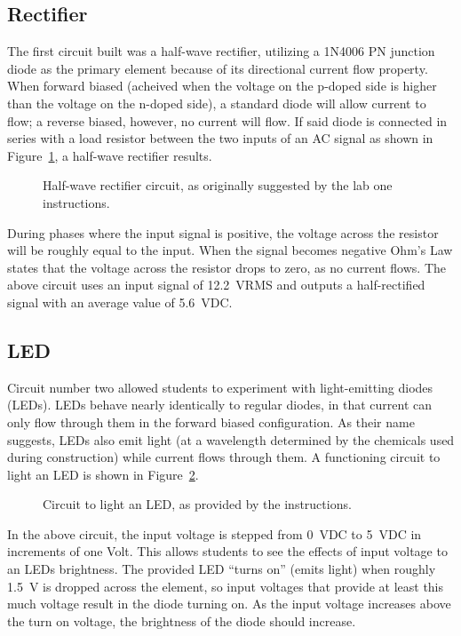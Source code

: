 \subsection{Rectifier}
The first circuit built was a half-wave rectifier, utilizing a 1N4006 PN
junction diode as the primary element because of its directional current flow
property.  When forward biased (acheived when the voltage on the p-doped side
is higher than the voltage on the n-doped side), a standard diode will allow
current to flow; a reverse biased, however, no current will flow.  If said
diode is connected in series with a load resistor between the two inputs of an
AC signal as shown in Figure~\ref{fig:schem1}, a half-wave rectifier results.
%
\begin{figure}[H]
	\centering
	
	\caption{Half-wave rectifier circuit, as originally suggested by the lab one instructions.}
	\label{fig:schem1}
\end{figure}
%
During phases where the input signal is positive, the voltage across the
resistor will be roughly equal to the input.  When the signal becomes negative
Ohm's Law states that the voltage across the resistor drops to zero, as no
current flows.  The above circuit uses an input signal of \SI{12.2}{\volt}RMS
and outputs a half-rectified signal with an average value of \SI{5.6}{\volt}DC.

\subsection{LED}
Circuit number two allowed students to experiment with light-emitting diodes
(LEDs).  LEDs behave nearly identically to regular diodes, in that current can
only flow through them in the forward biased configuration.  As their name
suggests, LEDs also emit light (at a wavelength determined by the chemicals
used during construction) while current flows through them.  A functioning
circuit to light an LED is shown in Figure~\ref{fig:schem2}.
%
\begin{figure}[H]
	\centering
	
	\caption{Circuit to light an LED, as provided by the instructions.}
	\label{fig:schem2}
\end{figure}
%
In the above circuit, the input voltage is stepped from \SI{0}{\volt}DC to
\SI{5}{\volt}DC in increments of one Volt.  This allows students to see the
effects of input voltage to an LEDs brightness.  The provided LED ``turns on''
(emits light) when roughly \SI{1.5}{\volt} is dropped across the element, so
input voltages that provide at least this much voltage result in the diode
turning on.  As the input voltage increases above the turn on voltage, the
brightness of the diode should increase.


